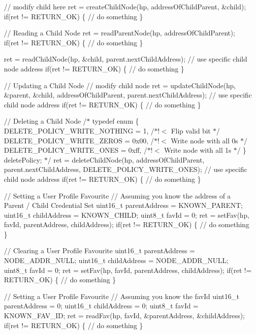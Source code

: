 // modify child here ret = create\+Child\+Node(hp, address\+Of\+Child\+Parent, \&child); if(ret != R\+E\+T\+U\+R\+N\+\_\+\+OK) \{ // do something \}

// Reading a Child Node ret = read\+Parent\+Node(hp, address\+Of\+Child\+Parent); if(ret != R\+E\+T\+U\+R\+N\+\_\+\+OK) \{ // do something \}

ret = read\+Child\+Node(hp, \&child, parent.\+next\+Child\+Address); // use specific child node address if(ret != R\+E\+T\+U\+R\+N\+\_\+\+OK) \{ // do something \}

// Updating a Child Node // modify child node ret = update\+Child\+Node(hp, \&parent, \&child, address\+Of\+Child\+Parent, parent.\+next\+Child\+Address); // use specific child node address if(ret != R\+E\+T\+U\+R\+N\+\_\+\+OK) \{ // do something \}

// Deleting a Child Node /$\ast$ typedef enum \{ D\+E\+L\+E\+T\+E\+\_\+\+P\+O\+L\+I\+C\+Y\+\_\+\+W\+R\+I\+T\+E\+\_\+\+N\+O\+T\+H\+I\+NG = 1, /$\ast$!$<$ Flip valid bit $\ast$/ D\+E\+L\+E\+T\+E\+\_\+\+P\+O\+L\+I\+C\+Y\+\_\+\+W\+R\+I\+T\+E\+\_\+\+Z\+E\+R\+OS = 0x00, /$\ast$!$<$ Write node with all 0\textquotesingle{}s $\ast$/ D\+E\+L\+E\+T\+E\+\_\+\+P\+O\+L\+I\+C\+Y\+\_\+\+W\+R\+I\+T\+E\+\_\+\+O\+N\+ES = 0xff, /$\ast$!$<$ Write node with all 1\textquotesingle{}s $\ast$/ \} delete\+Policy; $\ast$/ ret = delete\+Child\+Node(hp, address\+Of\+Child\+Parent, parent.\+next\+Child\+Address, D\+E\+L\+E\+T\+E\+\_\+\+P\+O\+L\+I\+C\+Y\+\_\+\+W\+R\+I\+T\+E\+\_\+\+O\+N\+ES); // use specific child node address if(ret != R\+E\+T\+U\+R\+N\+\_\+\+OK) \{ // do something \}

// Setting a User Profile Favourite // Assuming you know the address of a Parent / Child Credential Set uint16\+\_\+t parent\+Address = K\+N\+O\+W\+N\+\_\+\+P\+A\+R\+E\+NT; uint16\+\_\+t child\+Address = K\+N\+O\+W\+N\+\_\+\+C\+H\+I\+LD; uint8\+\_\+t fav\+Id = 0; ret = set\+Fav(hp, fav\+Id, parent\+Address, child\+Address); if(ret != R\+E\+T\+U\+R\+N\+\_\+\+OK) \{ // do something \}

// Clearing a User Profile Favourite uint16\+\_\+t parent\+Address = N\+O\+D\+E\+\_\+\+A\+D\+D\+R\+\_\+\+N\+U\+LL; uint16\+\_\+t child\+Address = N\+O\+D\+E\+\_\+\+A\+D\+D\+R\+\_\+\+N\+U\+LL; uint8\+\_\+t fav\+Id = 0; ret = set\+Fav(hp, fav\+Id, parent\+Address, child\+Address); if(ret != R\+E\+T\+U\+R\+N\+\_\+\+OK) \{ // do something \}

// Setting a User Profile Favourite // Assuming you know the fav\+Id uint16\+\_\+t parent\+Address = 0; uint16\+\_\+t child\+Address = 0; uint8\+\_\+t fav\+Id = K\+N\+O\+W\+N\+\_\+\+F\+A\+V\+\_\+\+ID; ret = read\+Fav(hp, fav\+Id, \&parent\+Address, \&child\+Address); if(ret != R\+E\+T\+U\+R\+N\+\_\+\+OK) \{ // do something \}

